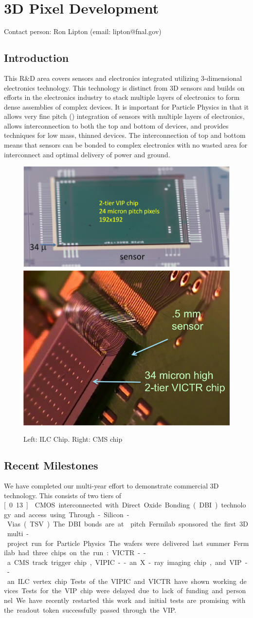 \section{3D Pixel Development}
Contact person: Ron Lipton (email: lipton@fnal.gov)
\subsection{Introduction}
This R\&D area covers sensors and electronics integrated utilizing 3-dimensional electronics technology.  This technology is distinct from 3D sensors and builds on efforts in the electronics industry to stack multiple layers of electronics to form dense assemblies of complex devices.  It is important for Particle Physics in that it allows very fine pitch (\unit[4]{\micron}) integration of sensors with multiple layers of electronics, allows interconnection to both the top and bottom of devices, and provides techniques for low mass, thinned devices. The interconnection of top and bottom means that sensors can be bonded to complex electronics with no wasted area for interconnect and optimal delivery of power and ground.
\begin{figure}
    \centering
    \includegraphics[width=.57\textwidth]{VertexDetector/VIP/ILCChip}
    \includegraphics[width=.37\textwidth]{VertexDetector/VIP/CMSChip}
    \caption{Left: ILC Chip. Right: CMS chip}
    \label{fig:VertexDetector:VIP:variants}
\end{figure}

\subsection{Recent Milestones}
We have completed our multi-year effort to demonstrate commercial 3D technology. This consists of two tiers of \unit[0.13]{\micron} CMOS interconnected with Direct Oxide Bonding (DBI) technology and access using Through-Silicon-Vias (TSV). The DBI bonds are at \unit[4]{\micron} pitch. Fermilab sponsored the first 3D multi-project run for Particle Physics. The wafers were delivered last summer. Fermilab had three chips on the run: VICTR -- a CMS track trigger chip, VIPIC -- an X-ray imaging chip, and VIP -- an ILC vertex chip. Tests of the VIPIC and VICTR have shown working devices.  Tests for the VIP chip were delayed due to lack of funding and personnel.  We have recently restarted this work and initial tests are promising with the readout token successfully passed through the VIP.

